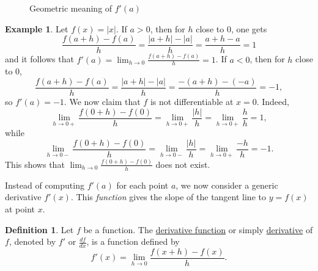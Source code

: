 \documentclass[12pt,letterpaper]{book}
\def\red{\textcolor{red}}
\numberwithin{equation}{section}
\theoremstyle{definition}
\newtheorem{defi}[thm]{\textbf{Definition}}
\newtheorem{example}[thm]{\textbf{Example}}
\begin{document}
\begin{figure}[h]
\begin{center}
\end{center}
\caption{Geometric meaning of $f'(a)$}
\label{geometric meaning of derivative}
\end{figure}

\begin{example}
Let $f(x)=|x|$. If $a>0$, then for $h$ close to $0$, one gets
$$\frac{f(a+h)-f(a)}{h}=\frac{|a+h|-|a|}{h}=\frac{a+h-a}{h}=1$$ and it follows that $\displaystyle{f'(a)=\lim_{h\to 0}\frac{f(a+h)-f(a)}{h}=1}$. If $a<0$, then for $h$ close to $0$,
$$\frac{f(a+h)-f(a)}{h}=\frac{|a+h|-|a|}{h}=\frac{-(a+h)-(-a)}{h}=-1,$$
so $f'(a)=-1$. We now claim that $f$ is not differentiable at $x=0$. Indeed,
$$\lim_{h\to 0+}\frac{f(0+h)-f(0)}{h}=\lim_{h\to 0+}\frac{|h|}{h}=\lim_{h\to 0+}\frac{h}{h}=1,$$
while
$$\lim_{h\to 0-}\frac{f(0+h)-f(0)}{h}=\lim_{h\to 0-}\frac{|h|}{h}=\lim_{h\to 0+}\frac{-h}{h}=-1.$$
This shows that $\displaystyle{\lim_{h\to 0}\frac{f(0+h)-f(0)}{h}}$ does not exist.
\end{example}

Instead of computing $f'(a)$ for each point $a$, we now consider a generic derivative $f'(x)$. This \textit{function} gives the slope of the tangent line to $y=f(x)$ at point $x$.

\begin{defi} Let $f$ be a function. The \underline{derivative function} or simply \underline{derivative} of $f$, denoted by $f'$ or $\displaystyle{\frac{df}{dx}}$, is a function defined by
$$f'(x)=\lim_{h\to 0}\frac{f(x+h)-f(x)}{h}.$$
\end{defi}
\end{document}
